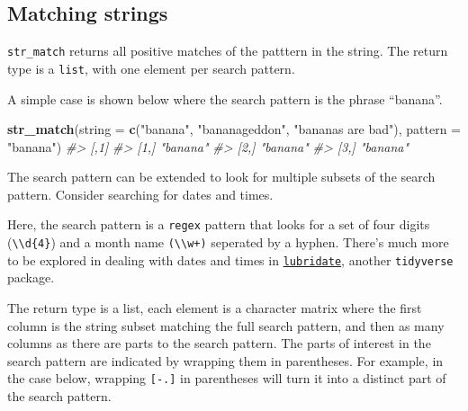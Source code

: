 \documentclass[]{book}
\newenvironment{Shaded}{}{}
\newcommand{\CommentTok}[1]{\textcolor[rgb]{0.38,0.63,0.69}{\textit{#1}}}
\newcommand{\DataTypeTok}[1]{\textcolor[rgb]{0.56,0.13,0.00}{#1}}
\newcommand{\KeywordTok}[1]{\textcolor[rgb]{0.00,0.44,0.13}{\textbf{#1}}}
\newcommand{\NormalTok}[1]{#1}
\newcommand{\StringTok}[1]{\textcolor[rgb]{0.25,0.44,0.63}{#1}}
\begin{document}
\hypertarget{matching-strings}{%
\subsection{Matching strings}\label{matching-strings}}

\texttt{str\_match} returns all positive matches of the patttern in the string.
The return type is a \texttt{list}, with one element per search pattern.

A simple case is shown below where the search pattern is the phrase ``banana''.

\begin{Shaded}
\begin{Highlighting}[]
\KeywordTok{str_match}\NormalTok{(}\DataTypeTok{string =} \KeywordTok{c}\NormalTok{(}\StringTok{"banana"}\NormalTok{,}
                     \StringTok{"bananageddon"}\NormalTok{,}
                     \StringTok{"bananas are bad"}\NormalTok{),}
          \DataTypeTok{pattern =} \StringTok{"banana"}\NormalTok{)}
\CommentTok{#>      [,1]    }
\CommentTok{#> [1,] "banana"}
\CommentTok{#> [2,] "banana"}
\CommentTok{#> [3,] "banana"}
\end{Highlighting}
\end{Shaded}

The search pattern can be extended to look for multiple subsets of the search pattern. Consider searching for dates and times.

Here, the search pattern is a \texttt{regex} pattern that looks for a set of four digits (\texttt{\textbackslash{}\textbackslash{}d\{4\}}) and a month name \texttt{(\textbackslash{}\textbackslash{}w+)} seperated by a hyphen. There's much more to be explored in dealing with dates and times in \href{https://lubridate.tidyverse.org/}{\texttt{lubridate}}, another \texttt{tidyverse} package.

The return type is a list, each element is a character matrix where the first column is the string subset matching the full search pattern, and then as many columns as there are parts to the search pattern. The parts of interest in the search pattern are indicated by wrapping them in parentheses. For example, in the case below, wrapping \texttt{{[}-.{]}} in parentheses will turn it into a distinct part of the search pattern.
\end{document}
